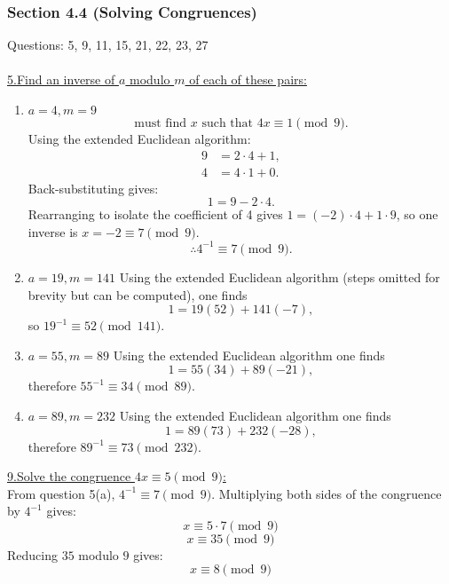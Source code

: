\documentclass[12pt]{article}
\begin{document}
\subsubsection*{Section 4.4 (Solving Congruences)}
Questions: 5, 9, 11, 15, 21, 22, 23, 27
\\\\
\noindent\underline{5.\;Find an inverse of $a$ modulo $m$ of each of these pairs:}
\begin{enumerate}[label=(\alph*)]
    \item $a =4, m=9$
    \[
    \text{must find } x \text{ such that } 4x \equiv 1 \pmod{9}.
    \]
    Using the extended Euclidean algorithm:
    \begin{align*}
    9 &= 2 \cdot 4 + 1, \\
    4 &= 4 \cdot 1 + 0.
    \end{align*}
    Back-substituting gives:
    \[
    1 = 9 - 2 \cdot 4.
    \]
    Rearranging to isolate the coefficient of 4 gives $1 = (-2)\cdot4 + 1\cdot9$, so one inverse is $x=-2\equiv7\pmod9$.
    \[
    \therefore 4^{-1} \equiv 7 \pmod{9}.
    \]

    \item $a =19, m=141$
    Using the extended Euclidean algorithm (steps omitted for brevity but can be computed), one finds
    \[
    1 = 19(52) + 141(-7),
    \]
    so $19^{-1} \equiv 52 \pmod{141}$.

    \item $a =55, m=89$
    Using the extended Euclidean algorithm one finds
    \[
    1 = 55(34) + 89(-21),
    \]
    therefore $55^{-1} \equiv 34 \pmod{89}$.

    \item $a =89, m=232$
    Using the extended Euclidean algorithm one finds
    \[
    1 = 89(73) + 232(-28),
    \]
    therefore $89^{-1} \equiv 73 \pmod{232}$.
\end{enumerate}
\vspace{5mm}
\noindent\underline{9.\;Solve the congruence $4x \equiv 5 \pmod{9}$:}
\\
From question 5(a), $4^{-1} \equiv 7 \pmod{9}$.
Multiplying both sides of the congruence by $4^{-1}$ gives:
\[x \equiv 5 \cdot 7 \pmod{9}\]
\[x \equiv 35 \pmod{9}\]
Reducing $35$ modulo $9$ gives:
\[x \equiv 8 \pmod{9}\]
\end{document}
